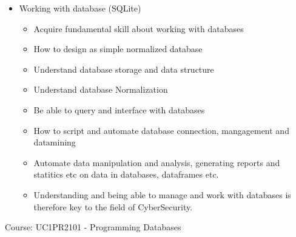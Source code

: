{\begin{itemize}
    \item Working with database (SQLite)
        \begin{itemize}
            \item Acquire fundamental skill about working with databases
            \item How to design as simple normalized database
            \item Understand database storage and data structure
            \item Understand database Normalization
            \item Be able to query and interface with databases
            \item How to script and automate database connection, mangagement and datamining
            \item Automate data manipulation and analysis, generating reports and statitics etc on data in databases, dataframes etc.
            \item Understanding and being able to manage and  work with databases is therefore key to the field of CyberSecurity.
        \end{itemize}
\end{itemize}

Course: UC1PR2101 - Programming Databases

}
